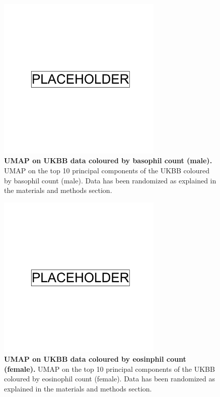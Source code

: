\newpage

\begin{figure}
    \centering
    \includegraphics[width=0.7\textwidth]{placeholder.png}
    \caption[UMAP on UKBB data coloured by basophil count (male)]{\textbf{UMAP on UKBB data coloured by basophil count (male).} UMAP on the top 10 principal components of the UKBB coloured by basophil count (male). Data has been randomized as explained in the materials and methods section.}
    \label{fig:supp_ukbb_basophill_m}
\end{figure}

\newpage

\begin{figure}
    \centering
    \includegraphics[width=0.7\textwidth]{placeholder.png}
    \caption[UMAP on UKBB data coloured by eosinphil count (female)]{\textbf{UMAP on UKBB data coloured by eosinphil count (female).} UMAP on the top 10 principal components of the UKBB coloured by eosinophil count (female). Data has been randomized as explained in the materials and methods section.}
    \label{fig:supp_ukbb_eosinophill_f}
\end{figure}

